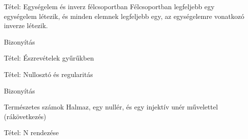 \documentclass{beamer}
\begin{document}
\begin{frame}[plain]
\end{frame}

\begin{frame}

\begin{block}{Tétel: Egységelem és inverz félcsoportban
Félcsoportban legfeljebb egy egységelem létezik, és minden elemnek legfeljebb egy, az egységelemre vonatkozó inverze létezik.}
\end{block}

\begin{block}{Bizonyítás}
\end{block}

\end{frame}

\begin{frame}

\begin{block}{Tétel: Észrevételek gyűrűkben}
\end{block}

\end{frame}

\begin{frame}

\begin{block}{Tétel: Nullosztó és regularitás}

\end{block}

\begin{block}{Bizonyítás}
\end{block}

\end{frame}

\begin{frame}

\begin{block}{Természetes számok}
Halmaz, egy nullér, és egy injektív unér művelettel (rákövetkezés)


\end{block}

\end{frame}

\begin{frame}

\begin{block}{Tétel: N rendezése}
\end{block}

\end{frame}
\end{document}
